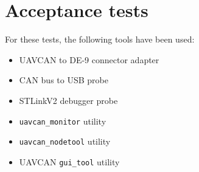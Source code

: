 \section{Acceptance tests}\label{sec:test_trace}
For these tests, the following tools have been used:
\begin{itemize}
    \item UAVCAN to DE-9 connector adapter
    \item CAN bus to USB probe
    \item STLinkV2 debugger probe
    \item \texttt{uavcan\_monitor} utility
    \item \texttt{uavcan\_nodetool} utility
    \item UAVCAN \texttt{gui\_tool} utility
\end{itemize}

